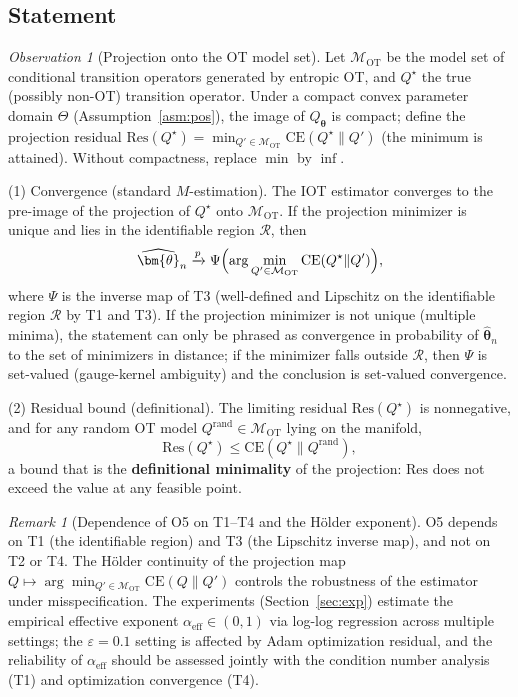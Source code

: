 \documentclass[11pt,a4paper]{article}
\theoremstyle{remark}
\newtheorem{remark}[theorem]{Remark}
\newtheorem{observation}[theorem]{Observation}
\begin{document}
\subsection{Statement}

\begin{observation}[Projection onto the OT model set]\label{obs:T5}
Let $\mathcal{M}_{\mathrm{OT}}$ be the model set of conditional transition operators
generated by entropic OT, and $Q^{\star}$ the true (possibly non-OT) transition operator.
Under a compact convex parameter domain $\Theta$ (Assumption~\ref{asm:pos}), the image of
$Q_{\bm{\theta}}$ is compact; define the projection residual
$\mathrm{Res}(Q^{\star})=\min_{Q'\in\mathcal{M}_{\mathrm{OT}}}\mathrm{CE}(Q^{\star}\|Q')$
(the minimum is attained). Without compactness, replace $\min$ by $\inf$.

(1) Convergence (standard $M$-estimation). The IOT estimator converges to the pre-image of
the projection of $Q^{\star}$ onto $\mathcal{M}_{\mathrm{OT}}$. If the projection minimizer
is unique and lies in the identifiable region $\mathcal{R}$, then
\[
\widehat{\bm{\theta}}_n\xrightarrow{p}\Psi\Bigl(\arg\min_{Q'\in\mathcal{M}_{\mathrm{OT}}}\mathrm{CE}(Q^{\star}\|Q')\Bigr),
\]
where $\Psi$ is the inverse map of T3 (well-defined and Lipschitz on the identifiable
region $\mathcal{R}$ by T1 and T3). If the projection minimizer is not unique (multiple
minima), the statement can only be phrased as convergence in probability of
$\widehat{\bm{\theta}}_n$ to the set of minimizers in distance; if the minimizer falls
outside $\mathcal{R}$, then $\Psi$ is set-valued (gauge-kernel ambiguity) and the
conclusion is set-valued convergence.

(2) Residual bound (definitional). The limiting residual $\mathrm{Res}(Q^{\star})$ is
nonnegative, and for any random OT model $Q^{\mathrm{rand}}\in\mathcal{M}_{\mathrm{OT}}$
lying on the manifold,
\[
\mathrm{Res}(Q^{\star})\le\mathrm{CE}(Q^{\star}\|Q^{\mathrm{rand}}),
\]
a bound that is the \textbf{definitional minimality} of the projection: $\mathrm{Res}$ does
not exceed the value at any feasible point.
\end{observation}

\begin{remark}[Dependence of O5 on T1--T4 and the H\"older exponent]
O5 depends on T1 (the identifiable region) and T3 (the Lipschitz inverse map), and not on
T2 or T4. The H\"older continuity of the projection map
$Q\mapsto\arg\min_{Q'\in\mathcal{M}_{\mathrm{OT}}}\mathrm{CE}(Q\|Q')$ controls the
robustness of the estimator under misspecification. The experiments
(Section~\ref{sec:exp}) estimate the empirical effective exponent
$\alpha_{\mathrm{eff}}\in(0,1)$ via log-log regression across multiple settings; the
$\varepsilon=0.1$ setting is affected by Adam optimization residual, and the reliability of
$\alpha_{\mathrm{eff}}$ should be assessed jointly with the condition number analysis (T1)
and optimization convergence (T4).
\end{remark}
\end{document}
